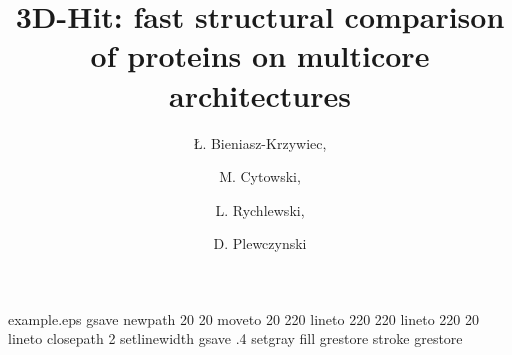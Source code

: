%
%
%
%
%
\begin{filecontents*}{example.eps}
gsave
newpath
  20 20 moveto
  20 220 lineto
  220 220 lineto
  220 20 lineto
closepath
2 setlinewidth
gsave
  .4 setgray fill
grestore
stroke
grestore
\end{filecontents*}
%
\RequirePackage{fix-cm}
%
\documentclass[smallextended]{svjour3}       %
%
\smartqed  %
%
\usepackage{graphicx}
%
%
%
%
\usepackage[latin1]{inputenc}
\usepackage[T1]{fontenc}
\usepackage[bottom]{footmisc}


\newcommand{\icm}{\emph{ICM}}
\newcommand{\ibm}{\emph{IBM}}
\newcommand{\prog}{\emph{3DHit}}






\title{3D-Hit: fast structural comparison of proteins on multicore architectures}
\label{DPlewczynski} %


\author{\L{}. Bieniasz-Krzywiec, \and 
M. Cytowski, \and 
L. Rychlewski, \and
D. Plewczynski       
}

